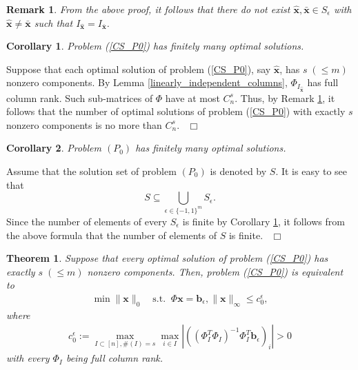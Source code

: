 \documentclass[12pt]{article}
\newtheorem{Theorem}{Theorem}[part]
\newtheorem{Corollary}{Corollary}[part]
\newtheorem{Remark}{Remark}[part]
\def \ep{\hbox{ }\hfill$\Box$}
\begin{document}
\begin{Remark}\label{uniqueness-on-I}
From the above proof, it follows that there do not exist $\hat{\mathbf{x}},\bar{\mathbf{x}}\in S_\epsilon$ with $\hat{\mathbf{x}}\neq \bar{\mathbf{x}}$ such that $I_{\hat{\mathbf{x}}}=I_{\bar{\mathbf{x}}}$.
\end{Remark}
\begin{Corollary}\label{finite-S-epsilon}
Problem {\rm(\ref{CS_P0})} has finitely many optimal solutions.
\end{Corollary}

Suppose that each optimal solution of problem (\ref{CS_P0}), say $\hat{\mathbf{x}}$, has $s\; (\leqslant m)$ nonzero components. By Lemma \ref{linearly_independent_columns}, $\Phi_{I_{\hat{\mathbf{x}}}}$ has full column rank. Such sub-matrices of $\Phi$ have at most $C_n^s$. Thus, by Remark \ref{uniqueness-on-I}, it follows that the number of optimal solutions of problem (\ref{CS_P0}) with exactly $s$ nonzero components is no more than $C_n^s$.
\ep

\begin{Corollary}\label{l0-norm-solution-number-is-finite}
Problem $(P_0)$ has finitely many optimal solutions.
\end{Corollary}

Assume that the solution set of problem $(P_0)$ is denoted by $S$. It is easy to see that
$$
S\subseteq \bigcup\limits_{\epsilon\in\{-1,1\}^m} S_\epsilon.
$$
Since the number of elements of every $S_\epsilon$ is finite by Corollary \ref{finite-S-epsilon}, it follows from the above formula that the number of elements of $S$ is finite.
\ep

\begin{Theorem}\label{CS_P0_implicitly-bounds}
Suppose that every optimal solution of problem {\rm(\ref{CS_P0})} has exactly $s\;(\leqslant m)$
nonzero components. Then, problem {\rm(\ref{CS_P0})} is equivalent to
\begin{eqnarray}\label{CS_P0-contain-bounds-implicitly}
\min \|\mathbf{x}\|_0\quad \textrm{s.t.}\;\; \Phi\mathbf{x}=\mathbf{b}_\epsilon, \|\mathbf{x}\|_{\infty}\leqslant c^\epsilon_0,
\end{eqnarray}
where
\begin{eqnarray}\label{define-implicit-bounds}
c^\epsilon_0:=\max\limits_{I\subset[n],\#(I)=s}\max\limits_{i\in I}|((\Phi^{T}_{I}\Phi_{I})^{-1}\Phi^{T}_{I}\mathbf{b}_\epsilon)_i|>0
\end{eqnarray}
with every $\Phi_{I}$ being full column rank.
\end{Theorem}
\end{document}
